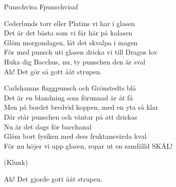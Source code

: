 \begin{song}{Punschvisa F}{punschvisaf}
\begin{vers}
Cederlunds torr eller Platins vi har i glasen\\
Det är det bästa som vi får här på kalasen\\
Glöm morgondagen, låt det skvalpa i magen\\
För med punsch uti glasen dricka vi till Dragos lov\\
Huka dig Bacchus, nu, ty punschen den är sval\\
Ah! Det gör så gott ååt strupen.
\end{vers}
\begin{vers}
Carlshamns flaggpunsch och Grönstedts blå\\
Det är en blandning som förunnad är åt få \\
Men på bordet bredvid koppen, med en yta så klar\\
Där står punschen och väntar på att drickas\\
Nu är det dags för bacchanal\\
Glöm bort fysiken med dess fruktansvärda kval\\
För nu höjer vi upp glasen, ropar ut en samfälld SKÅL!\\
\end{vers}
\begin{vers}
(Klunk)
\end{vers}
\begin{vers}
Ah! Det gjorde gott ååt strupen.
\end{vers}
\end{song}
